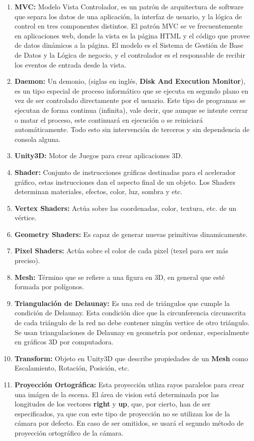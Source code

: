 \begin{enumerate}
\item \textbf{MVC:} Modelo Vista Controlador, es un patrón de arquitectura de software que separa los datos de una aplicación, la interfaz de usuario, y la lógica de control en tres componentes distintos. El patrón MVC se ve frecuentemente en aplicaciones web, donde la vista es la página HTML y el código que provee de datos dinámicos a la página. El modelo es el Sistema de Gestión de Base de Datos y la Lógica de negocio, y el controlador es el responsable de recibir los eventos de entrada desde la vista.
\item \textbf{Daemon:} Un demonio, (siglas en inglés, \textbf{Disk And Execution Monitor}), es un tipo especial de proceso informático que se ejecuta en segundo plano en vez de ser controlado directamente por el usuario. Este tipo de programas se ejecutan de forma continua (infinita), vale decir, que aunque se intente cerrar o matar el proceso, este continuará en ejecución o se reiniciará automáticamente. Todo esto sin intervención de terceros y sin dependencia de consola alguna.
\item \textbf{Unity3D:} Motor de Juegos para crear aplicaciones 3D.
\item \textbf{Shader:} Conjunto de instrucciones gráficas destinadas para el acelerador gráfico, estas instrucciones dan el aspecto final de un objeto. Los Shaders determinan materiales, efectos, color, luz, sombra y etc.
\item \textbf{Vertex Shaders:} Actúa sobre las coordenadas, color, textura, etc. de un vértice.
\item \textbf{Geometry Shaders:} Es capaz de generar nuevas primitivas dinamicamente.
\item \textbf{Pixel Shaders:} Actúa sobre el color de cada pixel (texel para ser más preciso).
\item \textbf{Mesh:} Término que se refiere a una figura en 3D, en general que esté formada por polígonos.
\item \textbf{Triangulación de Delaunay:} Es una red de triángulos que cumple la condición de Delaunay. Esta condición dice que la circunferencia circunscrita de cada triángulo de la red no debe contener ningún vertice de otro triángulo. Se usan triangulaciones de Delaunay en geometría por ordenar, especialmente en gráficos 3D por computadora.
\item \textbf{Transform:} Objeto en Unity3D que describe propiedades de un \textbf{Mesh} como Escalamiento, Rotación, Posición, etc.
\item \textbf{Proyección Ortográfica:} Esta proyección utliza rayos paralelos para crear una imágen de la escena. El área de vision está determinada por las longitudes de los vectores \textbf{right} y \textbf{up}, que, por cierto, han de ser especificados, ya que con este tipo de proyección no se utilizan los de la cámara por defecto. En caso de ser omitidos, se usará el segundo método de proyección ortográfico de la cámara.

\end{enumerate}
